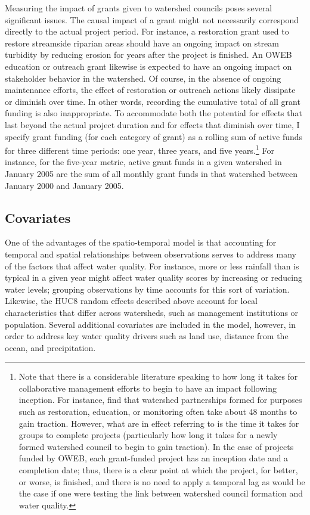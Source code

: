 \documentclass[12pt,a4paper,titlepage]{article}
\begin{document}
Measuring the impact of grants given to watershed councils poses several significant issues. The causal impact of a grant might not necessarily correspond directly to the actual project period. For instance, a restoration grant used to restore streamside riparian areas should have an ongoing impact on stream turbidity by reducing erosion for years after the project is finished. An OWEB education or outreach grant likewise is expected to have an ongoing impact on stakeholder behavior in the watershed. Of course, in the absence of ongoing maintenance efforts, the effect of restoration or outreach actions likely dissipate or diminish over time. In other words, recording the cumulative total of all grant funding is also inappropriate. To accommodate both the potential for effects that last beyond the actual project duration and for effects that diminish over time, I specify grant funding (for each category of grant) as a rolling sum of active funds for three different time periods: one year, three years, and five years.\footnote{Note that there is a considerable literature speaking to how long it takes for collaborative management efforts to begin to have an impact following inception. For instance, \textcite{leach2002} find that watershed partnerships formed for purposes such as restoration, education, or monitoring often take about 48 months to gain traction. However, what \textcite{leach2002} are in effect referring to is the time it takes for groups to complete projects (particularly how long it takes for a newly formed watershed council to begin to gain traction). In the case of projects funded by OWEB, each grant-funded project has an inception date and a completion date; thus, there is a clear point at which the project, for better, or worse, is finished, and there is no need to apply a temporal lag as would be the case if one were testing the link between watershed council formation and water quality.} For instance, for the five-year metric, active grant funds in a given watershed in January 2005 are the sum of all monthly grant funds in that watershed between January 2000 and January 2005.


\subsection*{Covariates}

One of the advantages of the spatio-temporal model is that accounting for temporal and spatial relationships between observations serves to address many of the factors that affect water quality. For instance, more or less rainfall than is typical in a given year might affect water quality scores by increasing or reducing water levels; grouping observations by time accounts for this sort of variation. Likewise, the HUC8 random effects described above account for local characteristics that differ across watersheds, such as management institutions or population. Several additional covariates are included in the model, however, in order to address key water quality drivers such as land use, distance from the ocean, and precipitation.
\end{document}
